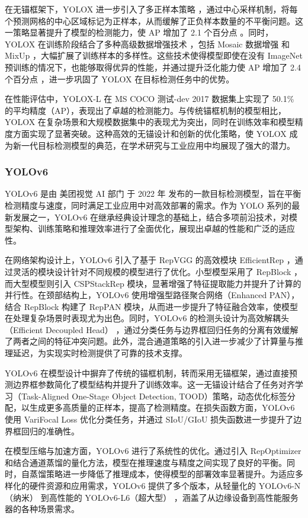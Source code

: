 \documentclass[11pt,twocolumn]{ctexart}
\begin{document}
在无锚框架下，YOLOX 进一步引入了多正样本策略 ，通过中心采样机制，将每个预测网格的中心区域标记为正样本，从而缓解了正负样本数量的不平衡问题。这一策略显著提升了模型的检测能力，使 AP 增加了 2.1 个百分点 。同时，YOLOX 在训练阶段结合了多种高级数据增强技术 ，包括 Mosaic 数据增强 和 MixUp ，大幅扩展了训练样本的多样性。这些技术使得模型即使在没有 ImageNet 预训练的情况下，也能够取得优异的性能，并通过提升泛化能力使 AP 增加了 2.4 个百分点 ，进一步巩固了 YOLOX 在目标检测任务中的优势。

在性能评估中，YOLOX-L 在 MS COCO 测试-dev 2017 数据集上实现了 50.1\% 的平均精度（AP），表现出了卓越的检测能力。与传统锚框机制的模型相比，YOLOX 在复杂场景和大规模数据集中的表现尤为突出，同时在训练效率和模型精度方面实现了显著突破。这种高效的无锚设计和创新的优化策略，使 YOLOX 成为新一代目标检测模型的典范，在学术研究与工业应用中均展现了强大的潜力。
\subsubsection{YOLOv6}
YOLOv6\cite{li2022yolov6} 是由 美团视觉 AI 部门 于 2022 年 发布的一款目标检测模型，旨在平衡检测精度与速度，同时满足工业应用中对高效部署的需求。作为 YOLO 系列的最新发展之一，YOLOv6 在继承经典设计理念的基础上，结合多项前沿技术，对模型架构、训练策略和推理效率进行了全面优化，展现出卓越的性能和广泛的适应性。

在网络架构设计上，YOLOv6 引入了基于 RepVGG\cite{ding2021repvgg} 的高效模块 EfficientRep ，通过灵活的模块设计针对不同规模的模型进行了优化。小型模型采用了 RepBlock ，而大型模型则引入 CSPStackRep 模块，显著增强了特征提取能力并提升了计算的并行性。在颈部结构上，YOLOv6 使用增强型路径聚合网络（Enhanced PAN），结合 RepBlock 构建了 RepPAN 模块，从而进一步提升了特征融合效率，使模型在处理复杂场景时表现尤为出色。同时，YOLOv6 的检测头设计为高效解耦头（Efficient Decoupled Head） ，通过分类任务与边界框回归任务的分离有效缓解了两者之间的特征冲突问题。此外，混合通道策略的引入进一步减少了计算量与推理延迟，为实现实时检测提供了可靠的技术支撑。

YOLOv6 在模型设计中摒弃了传统的锚框机制，转而采用无锚框架，通过直接预测边界框参数简化了模型结构并提升了训练效率。这一无锚设计结合了任务对齐学习（Task-Aligned One-Stage Object Detection, TOOD）\cite{feng2021tood}策略，动态优化标签分配，以生成更多高质量的正样本，提高了检测精度。在损失函数方面，YOLOv6 使用 VariFocal Loss 优化分类任务，并通过 SIoU/GIoU 损失函数进一步提升了边界框回归的准确性。

在模型压缩与加速方面，YOLOv6 进行了系统性的优化。通过引入 RepOptimizer 和结合通道蒸馏的量化方法，模型在推理速度与精度之间实现了良好的平衡。同时，自蒸馏策略进一步降低了推理成本，使得模型的部署效率显著提升。为适应多样化的硬件资源和应用需求，YOLOv6 提供了多个版本，从轻量化的 YOLOv6-N（纳米） 到高性能的 YOLOv6-L6（超大型） ，涵盖了从边缘设备到高性能服务器的各种场景需求。
\end{document}
